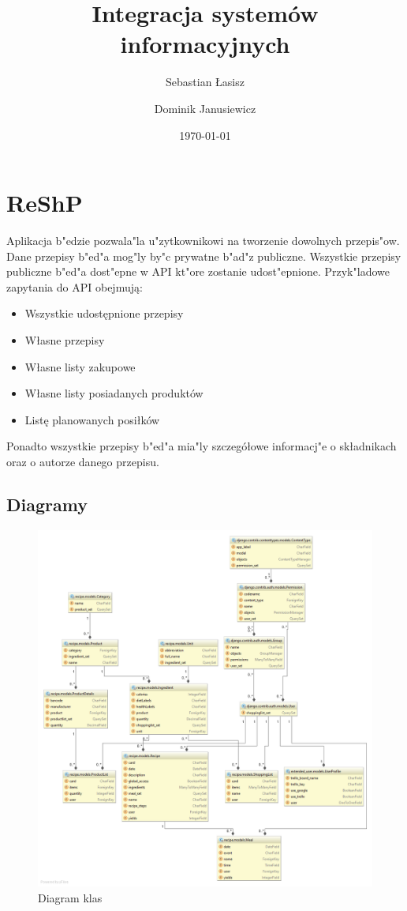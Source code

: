 \documentclass{article}
\title{Integracja systemów informacyjnych}
\author{
	Sebastian Łasisz
	\and
	Dominik Janusiewicz}
\date{\today}
\begin{document}
\maketitle

\section{ReShP}
	Aplikacja b"edzie pozwala"la u"zytkownikowi na tworzenie dowolnych przepis"ow. Dane przepisy b"ed"a mog"ly by"c prywatne b"ad"z publiczne. Wszystkie przepisy publiczne b"ed"a dost"epne w API kt"ore zostanie udost"epnione. Przyk"ladowe zapytania do API obejmują:
	\begin{itemize}
		\item Wszystkie udostępnione przepisy
		\item Własne przepisy
		\item Własne listy zakupowe
		\item Własne listy posiadanych produktów
		\item Listę planowanych posiłków
	\end{itemize}
	Ponadto wszystkie przepisy b"ed"a mia"ly szczegółowe informacj"e o składnikach oraz o autorze danego przepisu.

\subsection{Diagramy}
\begin{figure}[!ht]
  \centering
    \includegraphics[width=1\textwidth]{class}\par\vspace{1cm}
  \caption{Diagram klas}
\end{figure}
\end{document}
